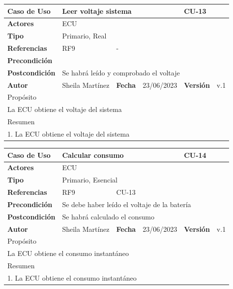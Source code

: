         \begin{table}[H]
            \begin{tabular}{|l|l|l|l|l|l|}
            \hline
            \textbf{Caso de Uso} & \multicolumn{3}{l|}{Leer voltaje sistema} & \multicolumn{2}{l|}{CU-13} \\ \hline
            \textbf{Actores} & \multicolumn{5}{l|}{ECU} \\ \hline
            \textbf{Tipo} & \multicolumn{5}{l|}{Primario, Real} \\ \hline
            \textbf{Referencias} & RF9 & \multicolumn{4}{l|}{-} \\ \hline
            \textbf{Precondición} & \multicolumn{5}{l|}{} \\ \hline
            \textbf{Postcondición} & \multicolumn{5}{l|}{Se habrá leído y comprobado el voltaje} \\ \hline
            \textbf{Autor} & Sheila Martínez & \textbf{Fecha} & 23/06/2023 & \textbf{Versión} & v.1 \\ \hline
            \multicolumn{6}{|l|}{\cellcolor[HTML]{ECF4FF}Propósito} \\ \hline
            \multicolumn{6}{|l|}{La ECU obtiene el voltaje del sistema} \\ \hline
            \multicolumn{6}{|l|}{\cellcolor[HTML]{ECF4FF}Resumen} \\ \hline
            \multicolumn{6}{|l|}{1. La ECU obtiene el voltaje del sistema} \\ \hline
            \end{tabular}%
            \end{table}


\begin{table}[H]
    \begin{tabular}{|l|l|l|l|l|l|}
    \hline
    \textbf{Caso de Uso} & \multicolumn{3}{l|}{Calcular consumo} & \multicolumn{2}{l|}{CU-14} \\ \hline
    \textbf{Actores} & \multicolumn{5}{l|}{ECU} \\ \hline
    \textbf{Tipo} & \multicolumn{5}{l|}{Primario, Esencial} \\ \hline
    \textbf{Referencias} & RF9 & \multicolumn{4}{l|}{CU-13} \\ \hline
    \textbf{Precondición} & \multicolumn{5}{l|}{Se debe haber leído el voltaje de la batería} \\ \hline
    \textbf{Postcondición} & \multicolumn{5}{l|}{Se habrá calculado el consumo} \\ \hline
    \textbf{Autor} & Sheila Martínez & \textbf{Fecha} & 23/06/2023 & \textbf{Versión} & v.1 \\ \hline
    \multicolumn{6}{|l|}{\cellcolor[HTML]{ECF4FF}Propósito} \\ \hline
    \multicolumn{6}{|l|}{La ECU obtiene el consumo instantáneo} \\ \hline
    \multicolumn{6}{|l|}{\cellcolor[HTML]{ECF4FF}Resumen} \\ \hline
    \multicolumn{6}{|l|}{1. La ECU obtiene el consumo instantáneo} \\ \hline
    \end{tabular}%
    \end{table}

